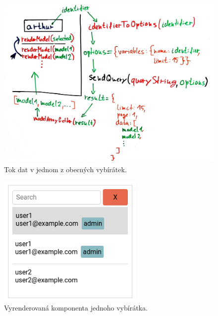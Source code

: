 \begin{figure}[!htb] \centering
  \includegraphics[width=145mm]{../img/picker_lifecycle.jpg}
  \caption{Tok dat v jednom z obecných vybírátek.}
  \label{fig:picker_lifecycle}
\end{figure}

\begin{figure}[!htb] \centering
  \includegraphics[width=70mm]{../img/picker_component.png}
  \caption{Vyrenderovaná komponenta jednoho vybírátka.}
  \label{fig:picker_component}
\end{figure}
